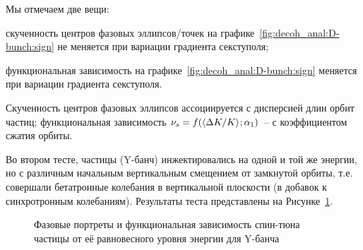 Мы отмечаем две вещи: 
\begin{enumerate*}[(1)]
	\item скученность центров фазовых эллипсов/точек на графике~\ref{fig:decoh_anal:D-bunch:sign} не меняется
	при вариации градиента секступоля;
	\item функциональная зависимость на графике~\ref{fig:decoh_anal:D-bunch:sign} меняется
	при вариации градиента секступоля.
\end{enumerate*}
%
Скученность центров фазовых эллипсов ассоциируется с дисперсией длин орбит частиц; 
функциональная зависимость ${\nu_s = f(\avg{\Delta K/K}; \alpha_1)}$ -- с коэффициентом сжатия орбиты.

Во втором тесте, частицы (Y-банч) инжектировались на одной и той же энергии, 
но с различным начальным вертикальным смещением от замкнутой орбиты, 
т.е. совершали бетатронные колебания в вертикальной плоскости (в добавок к синхротронным колебаниям).
Результаты теста представлены на Рисунке~\ref{fig:decoh_anal:Y-bunch}.

\begin{figure}[H]\centering
	\caption{Фазовые портреты и функциональная зависимость спин-тюна частицы от её равновесного уровня энергии для Y-банча\label{fig:decoh_anal:Y-bunch}}
\end{figure}

